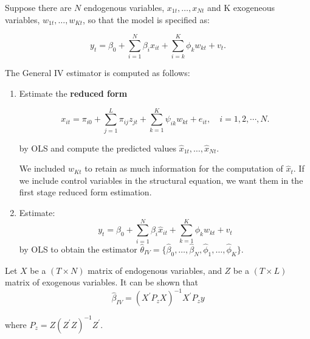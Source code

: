 \documentclass[11pt]{article}
\begin{document}
Suppose there are $N$ endogenous variables, $x_{1t}, \ldots, x_{Nt}$ and K exogeneous variables, $w_{1t}, \ldots, w_{Kt}$, so that the model is specified as:

\begin{equation}
y_t=\beta_0+\sum_{i=1}^N \beta_i x_{i t}+\sum_{i=k}^K \phi_k w_{k t}+v_t .
\end{equation}

\begin{procedure}
    The General IV estimator is computed as follows:
    \begin{enumerate}
        \item Estimate the \textbf{reduced form}

        \begin{equation}
x_{i t}=\pi_{i 0}+\sum_{j=1}^L \pi_{i j} z_{j t}+\sum_{k=1}^K \psi_{i k} w_{k t}+e_{i t}, \quad i=1,2, \cdots, N .
\end{equation}

by OLS and compute the predicted values $\hat{x}_{1t},\ldots, \hat{x}_{Nt}$. 

\begin{note}
    We included $w_{Kt}$ to retain as much information for the computation of $\hat{x}_t$. If we include control variables in the structural equation, we want them in the first stage reduced form estimation.
\end{note}

\item Estimate:
\begin{equation}
y_t=\beta_0+\sum_{i=1}^N \beta_i \widehat{x}_{i t}+\sum_{k=1}^K \phi_k w_{k t}+v_t
\end{equation}
by OLS to obtain the estimator $\hat{\theta}_{IV} = \{\hat{\beta}_0, \ldots, \hat{\beta}_N, \hat{\phi}_1, \ldots, \hat{\phi}_K\}$.
    \end{enumerate}
\end{procedure}

Let $X$ be a $(T\times N)$ matrix of endogenous variables, and $Z$ be a $(T\times L)$ matrix of exogenous variables. It can be shown that
\begin{equation*}
\hat{\beta}_{I V}=\left(X^{\prime} P_z X\right)^{-1} X^{\prime} P_z y
\end{equation*}

where $P_z=Z\left(Z^{\prime} Z\right)^{-1} Z^{\prime}$.
\end{document}
